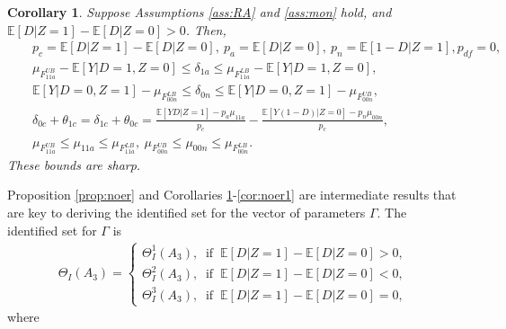 \documentclass[12pt]{article}
\theoremstyle{plain}
\newtheorem{corollary}{Corollary}%
\theoremstyle{definition}
\theoremstyle{remark}
\begin{document}
\begin{corollary}\label{cor:noer2}
   Suppose Assumptions \ref{ass:RA} and \ref{ass:mon} hold, and $\mathbb{E}[D  \vert  Z=1] - \mathbb{E}[D  \vert  Z=0]> 0$. Then,
\begin{eqnarray*}
    && p_c=\mathbb{E}[D  \vert  Z=1] - \mathbb{E}[D  \vert  Z=0],\ p_a=\mathbb E[D\vert Z=0],\ p_n=\mathbb E[1-D\vert Z=1], p_{df}=0,\\
    && \mu_{F_{11a}^{UB}}-\mathbb E[Y \vert D=1, Z=0] \leq \delta_{1a} \leq \mu_{F_{11a}^{LB}}-\mathbb E[Y \vert D=1, Z=0],\\
    &&\mathbb E[Y \vert D=0, Z=1]-\mu_{F_{00n}^{LB}} \leq \delta_{0n} \leq \mathbb E[Y \vert D=0, Z=1]-\mu_{F_{00n}^{UB}},\\
    && \delta_{0c}+\theta_{1c}=\delta_{1c}+\theta_{0c} = \frac{\mathbb E[Y D \vert Z=1]- p_a \mu_{11a}}{p_c}-\frac{\mathbb E[Y (1-D) \vert Z=0]- p_n \mu_{00n}}{p_c},\\
    && \mu_{F_{11a}^{UB}} \leq \mu_{11a} \leq \mu_{F_{11a}^{LB}},\ \mu_{F_{00n}^{UB}} \leq \mu_{00n} \leq \mu_{F_{00n}^{LB}}.
\end{eqnarray*}   
These bounds are sharp.  

\end{corollary}
Proposition \ref{prop:noer} and Corollaries \ref{cor:noer2}-\ref{cor:noer1} are intermediate results that are key to deriving the identified set for the vector of parameters $\Gamma$. 
The identified set for $\Gamma$ is 
\begin{eqnarray*} 
\Theta_I(A_3)=\left\{\begin{array}{l}
        \Theta_I^1(A_3),\ \text{ if }\ \mathbb{E}[D  \vert  Z=1] - \mathbb{E}[D  \vert  Z=0]> 0,\\
        \Theta_I^2(A_3),\ \text{ if }\ \mathbb{E}[D  \vert  Z=1] - \mathbb{E}[D  \vert  Z=0]< 0,\\
       \Theta_I^3(A_3),\ \text{ if }\ \mathbb{E}[D  \vert  Z=1] - \mathbb{E}[D  \vert  Z=0]= 0,
        \end{array}\right.
\end{eqnarray*} 
where
\end{document}
